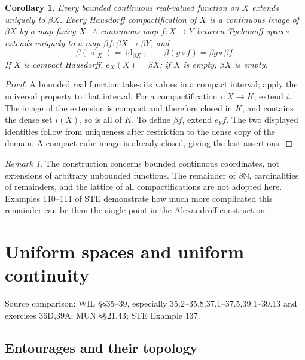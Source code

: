 \documentclass[11pt,oneside,openany]{book}
\newtheorem{corollary}[theorem]{Corollary}
\theoremstyle{definition}
\theoremstyle{remark}
\newtheorem{remark}[theorem]{Remark}
\newcommand{\N}{\mathbb N}\newcommand{\Z}{\mathbb Z}\newcommand{\Q}{\mathbb Q}
\DeclareMathOperator{\id}{id}
\newcommand{\source}[1]{\par\begingroup\small\sffamily\color{black!65}Source comparison: #1\par\endgroup}
\begin{document}
\begin{corollary}\label{d10:11:beta-consequences}
Every bounded continuous real-valued function on $X$ extends uniquely to $\beta X$. Every Hausdorff compactification of $X$ is a continuous image of $\beta X$ by a map fixing $X$. A continuous map $f:X\to Y$ between Tychonoff spaces extends uniquely to a map $\beta f:\beta X\to\beta Y$, and
\[
 \beta(\id_X)=\id_{\beta X},\qquad \beta(g\circ f)=\beta g\circ\beta f.
\]
If $X$ is compact Hausdorff, $e_X(X)=\beta X$; if $X$ is empty, $\beta X$ is empty.
\end{corollary}
\begin{proof}
A bounded real function takes its values in a compact interval; apply the universal property to that interval. For a compactification $i:X\to K$, extend $i$. The image of the extension is compact and therefore closed in $K$, and contains the dense set $i(X)$, so is all of $K$. To define $\beta f$, extend $e_Yf$. The two displayed identities follow from uniqueness after restriction to the dense copy of the domain. A compact cube image is already closed, giving the last assertions.
\end{proof}

\begin{remark}\label{d10:11:compactification-scope}
The construction concerns bounded continuous coordinates, not extensions of arbitrary unbounded functions. The remainder of $\beta\N$, cardinalities of remainders, and the lattice of all compactifications are not adopted here. Examples 110--111 of STE demonstrate how much more complicated this remainder can be than the single point in the Alexandroff construction.
\end{remark}



\chapter{Uniform spaces and uniform continuity}\label{ch:d10-12}
\source{WIL \S\S35--39, especially 35.2--35.8,37.1--37.5,39.1--39.13 and exercises 36D,39A; MUN \S\S21,43; STE Example 137.}

\section{Entourages and their topology}
\end{document}
